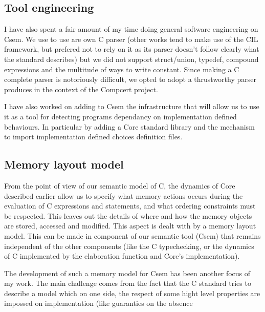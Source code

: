 \documentclass[11pt,a4paper,twocolumn]{article}
\begin{document}
\subsection*{Tool engineering}

I have also spent a fair amount of my time doing general software
engineering on Csem. We use to use are own C parser (other works tend
to make use of the CIL framework, but prefered not to rely on it as
its parser doesn't follow clearly what the standard describes) but we
did not support struct/union, typedef, compound expressions  and the
multitude of ways to write constant. Since making a C complete parser
is notoriously difficult, we opted to adopt a thrustworthy parser
produces in the context of the Compcert project.

I have also worked on adding to Csem the infrastructure that will
allow us to use it as a tool for detecting programs dependancy on
implementation defined behaviours. In particular by adding a Core
standard library and the mechanism to import implementation defined
choices definition files.


\subsection*{Memory layout model}

From the point of view of our semantic model of C, the dynamics of
Core described earlier allow us to specify what memory actions occurs
during the evaluation of C expressions and statements, and what
ordering constraints must be respected. This leaves out the details of
where and how the memory objects are stored, accessed and
modified. This aspect is dealt with by a memory layout model. This can
be made in component of our semantic tool (Csem) that remains
independent of the other components (like the C typechecking, or the
dynamics of C implemented by the elaboration function and Core's
implementation).

The development of such a memory model for Csem has been another focus
of my work. The main challenge comes from the fact that the C standard
tries to describe a model which on one side, the respect of some hight
level properties are impossed on implementation (like guaranties on
the absence 
\end{document}
